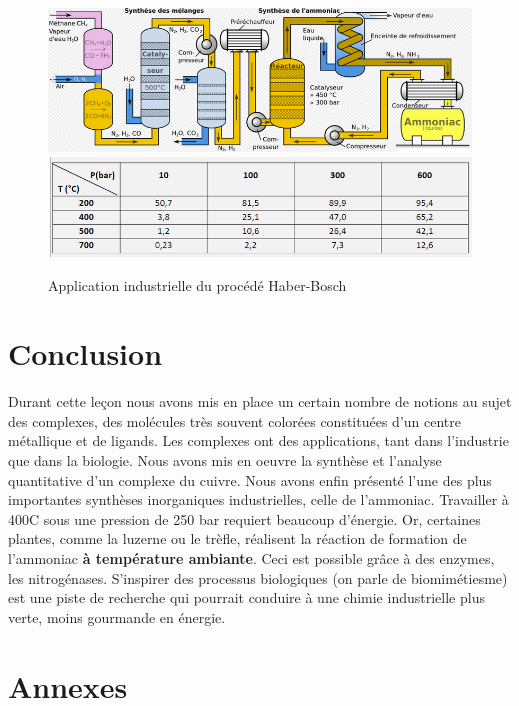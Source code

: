 \documentclass[11pt,a4paper]{report}
\begin{document}
\begin{figure}[h!]
	\begin{center}
  		\includegraphics[scale = 0.8]{synthese_nh3.png}\\
  		\includegraphics[scale = 0.8]{tableau_data}
		\caption{Application industrielle du procédé Haber-Bosch}
	\end{center}
\end{figure}

\section*{Conclusion}

Durant cette leçon nous avons mis en place un certain nombre de notions au sujet des complexes, des molécules très souvent colorées constituées d'un centre métallique et de ligands. Les complexes ont des applications, tant dans l'industrie que dans la biologie. Nous avons mis en oeuvre la synthèse et l'analyse quantitative d'un complexe du cuivre. Nous avons enfin présenté l'une des plus importantes synthèses inorganiques industrielles, celle de l'ammoniac. Travailler à 400\degree C sous une pression de 250 bar requiert beaucoup d'énergie. Or, certaines plantes, comme la luzerne ou le trèfle, réalisent la réaction de formation de l'ammoniac \textbf{à température ambiante}. Ceci est possible grâce à des enzymes, les nitrogénases. S'inspirer des processus biologiques (on parle de biomimétiesme) est une piste de recherche qui pourrait conduire à une chimie industrielle plus verte, moins gourmande en énergie.




\newpage
\section*{Annexes}
\end{document}

